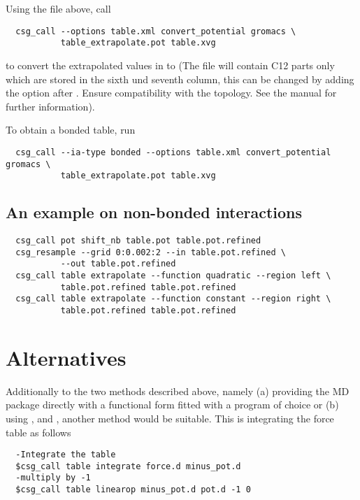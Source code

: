 Using the  file above, call
\begin{verbatim}
  csg_call --options table.xml convert_potential gromacs \
           table_extrapolate.pot table.xvg
\end{verbatim}
to convert the extrapolated values in  to  (The file will contain \gromacs C12 parts only which are stored in the sixth und seventh column, this can be changed by adding the  option after . Ensure compatibility with the \gromacs topology. See the \gromacs manual for further information).

To obtain a bonded table, run
\begin{verbatim}
  csg_call --ia-type bonded --options table.xml convert_potential gromacs \
           table_extrapolate.pot table.xvg
\end{verbatim}

\subsection*{An example on non-bonded interactions}
\begin{verbatim}
  csg_call pot shift_nb table.pot table.pot.refined
  csg_resample --grid 0:0.002:2 --in table.pot.refined \
           --out table.pot.refined
  csg_call table extrapolate --function quadratic --region left \
           table.pot.refined table.pot.refined
  csg_call table extrapolate --function constant --region right \
           table.pot.refined table.pot.refined
\end{verbatim}


\section{Alternatives}
Additionally to the two methods described above, namely (a) providing the MD package directly with a functional form fitted with a program of choice or (b) using ,  and , another method would be suitable. This is integrating the force table as follows
\begin{verbatim}
  -Integrate the table
  $csg_call table integrate force.d minus_pot.d
  -multiply by -1
  $csg_call table linearop minus_pot.d pot.d -1 0
\end{verbatim}
